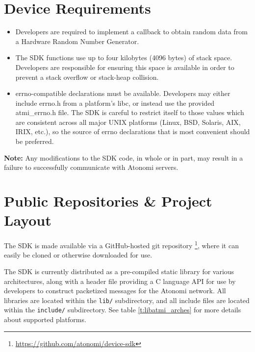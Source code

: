 \section{Device Requirements}
\begin{itemize}
	\item Developers are required to implement a callback to obtain random data from
a Hardware Random Number Generator.
	\item The SDK functions use up to four kilobytes (4096 bytes) of stack space.
		Developers are responsible for ensuring this space is available
		in order to prevent a stack overflow or stack-heap collision.
	\item errno-compatible declarations must be available. Developers may either
		include errno.h from a platform's libc, or instead use the provided
		atmi_errno.h file. The SDK is careful to restrict itself to those
		values which are consistent across all major UNIX platforms (Linux, BSD,
		Solaris, AIX, IRIX, etc.), so the source of errno declarations
		that is most convenient should be preferred.
\end{itemize}

\textbf{Note:} Any modifications to the SDK code, in whole or in part, may
result in a failure to successfully communicate with Atonomi servers.


\section{Public Repositories \&{} Project Layout}
The SDK is made available via a GitHub-hosted git repository
\footnote{\url{https://github.com/atonomi/device-sdk}},
where it can easily be cloned or otherwise downloaded for use.

The SDK is currently distributed as a pre-compiled static library for
various architectures, along with a header file providing a C language
API for use by developers to construct packetized messages for
the Atonomi network. All libraries are located within the
\texttt{lib/} subdirectory, and all include files are located within the
\texttt{include/} subdirectory. See table \ref{t:libatmi_arches} for more
details about supported platforms.


